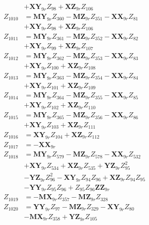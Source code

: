 \begin{multicols}{2}
\begin{align}
&+ \mathbf{XY}_{9r}Z_{98} + \mathbf{XZ}_{9r}Z_{106} \nonumber \\
Z_{1010} &= \mathbf{MY}_{9r}Z_{360} - \mathbf{MZ}_{9r}Z_{351} - \mathbf{XX}_{9r}Z_{81}  \nonumber \\
&+ \mathbf{XY}_{9r}Z_{98} + \mathbf{XZ}_{9r}Z_{106} \nonumber \\
Z_{1011} &= \mathbf{MY}_{9r}Z_{361} - \mathbf{MZ}_{9r}Z_{352} - \mathbf{XX}_{9r}Z_{82}  \nonumber \\
&+ \mathbf{XY}_{9r}Z_{99} + \mathbf{XZ}_{9r}Z_{107} \nonumber \\
Z_{1012} &= \mathbf{MY}_{9r}Z_{362} - \mathbf{MZ}_{9r}Z_{353} - \mathbf{XX}_{9r}Z_{83}  \nonumber \\
&+ \mathbf{XY}_{9r}Z_{100} + \mathbf{XZ}_{9r}Z_{108} \nonumber \\
Z_{1013} &= \mathbf{MY}_{9r}Z_{363} - \mathbf{MZ}_{9r}Z_{354} - \mathbf{XX}_{9r}Z_{84}  \nonumber \\
&+ \mathbf{XY}_{9r}Z_{101} + \mathbf{XZ}_{9r}Z_{109} \nonumber \\
Z_{1014} &= \mathbf{MY}_{9r}Z_{364} - \mathbf{MZ}_{9r}Z_{355} - \mathbf{XX}_{9r}Z_{85}  \nonumber \\
&+ \mathbf{XY}_{9r}Z_{102} + \mathbf{XZ}_{9r}Z_{110} \nonumber \\
Z_{1015} &= \mathbf{MY}_{9r}Z_{365} - \mathbf{MZ}_{9r}Z_{356} - \mathbf{XX}_{9r}Z_{86}  \nonumber \\
&+ \mathbf{XY}_{9r}Z_{103} + \mathbf{XZ}_{9r}Z_{111} \nonumber \\
Z_{1016} &= \mathbf{XY}_{9r}Z_{104} + \mathbf{XZ}_{9r}Z_{112} \nonumber \\
Z_{1017} &= -\mathbf{XX}_{9r} \nonumber \\
Z_{1018} &= \mathbf{MY}_{9r}Z_{579} - \mathbf{MZ}_{9r}Z_{578} - \mathbf{XX}_{9r}Z_{532}  \nonumber \\
&+ \mathbf{XY}_{9r}Z_{534} + \mathbf{XZ}_{9r}Z_{535} + \mathbf{YZ}_{9r}Z_{95}^2  \nonumber \\
&- \mathbf{YZ}_{9r}Z_{96}^2 - \mathbf{XY}_{9r}Z_{94}Z_{96} + \mathbf{XZ}_{9r}Z_{94}Z_{95}  \nonumber \\
&- \mathbf{YY}_{9r}Z_{95}Z_{96} + Z_{95}Z_{96}\mathbf{ZZ}_{9r} \nonumber \\
Z_{1019} &= - \mathbf{MX}_{9r}Z_{357} - \mathbf{MZ}_{9r}Z_{328} \nonumber \\
Z_{1020} &= \mathbf{YY}_{9r}Z_{97} - \mathbf{MZ}_{9r}Z_{329} - \mathbf{XY}_{9r}Z_{80}  \nonumber \\
&- \mathbf{MX}_{9r}Z_{358} + \mathbf{YZ}_{9r}Z_{105} \nonumber \\

\end{align}
\end{multicols}
